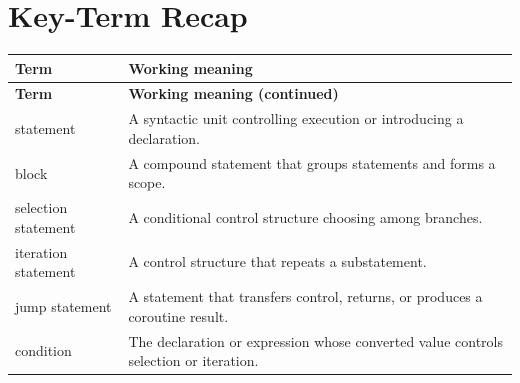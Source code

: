 \documentclass[11pt,letterpaper]{article}
\begin{document}
\section{Key-Term Recap}
\begin{longtable}{@{}>{\RaggedRight\arraybackslash}p{}>{\RaggedRight\arraybackslash}p{}@{}}\toprule\textbf{Term} & \textbf{Working meaning}\\\midrule\endfirsthead\toprule\textbf{Term} & \textbf{Working meaning (continued)}\\\midrule\endhead\bottomrule\endfoot
statement & A syntactic unit controlling execution or introducing a declaration.\\
block & A compound statement that groups statements and forms a scope.\\
selection statement & A conditional control structure choosing among branches.\\
iteration statement & A control structure that repeats a substatement.\\
jump statement & A statement that transfers control, returns, or produces a coroutine result.\\
condition & The declaration or expression whose converted value controls selection or iteration.\\
\end{longtable}
\end{document}
